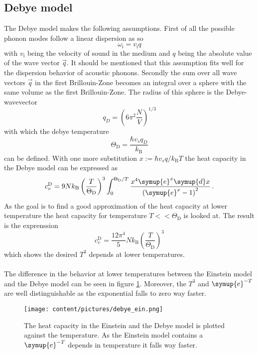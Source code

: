\subsection{Debye model}
The Debye model makes the following assumptions.
First of all the possible phonon modes follow a linear dispersion as so 
\begin{equation*}
    \omega_\text{i} = v_\text{i} q
\end{equation*}
with $v_\text{i}$ being the velocity of sound in the medium and $q$ being the absolute value of the wave vector $\vec{q}$.
It should be mentioned that this assumption fits well for the dispersion behavior of acoustic phonons.
Secondly the sum over all wave vectors $\vec{q}$ in the first Brillouin-Zone becomes an integral over a sphere with the same volume as the first Brillouin-Zone.
The radius of this sphere is the Debye-wavevector 
\begin{equation*}
    q_D = \left ( 6 \pi^2 \frac{N}{V} \right )^{1/3}
\end{equation*}
with which the debye temperature
\begin{equation*}
    \Theta_\text{D} = \frac{\hbar v_s q_{D}}{k_\text{B}}
\end{equation*}
can be defined.
With one more substitution $x :=  \hbar v_s q / k_\text{B}T$ the heat capacity in the Debye model can be expressed as
\begin{equation*}
    c_v ^{\text{D}} = 9 N k_\text{B} \left (\frac{T}{\Theta_\text{D}} \right )^3 \int_0^{\Theta_\text{D}/T} \frac{x^4 \symup{e}^x \symup{d}x}{\left( \symup{e}^x - 1\right)^2} \, .
    \label{eq:heat_debye}
\end{equation*}
As the goal is to find a good approximation of the heat capacity at lower temperature the heat capacity for temperature $T<<\Theta_\text{D}$ is looked at.
The result is the exprenssion
\begin{equation*}
    c_v ^{\text{D}} = \frac{12 \pi^4}{5} N k_\text{B} \left ( \frac{T}{\Theta_\text{D}} \right )^3
\end{equation*}
which shows the desired $T^3$ depends at lower temperatures.\\\\
The difference in the behavior at lower temperatures between the Einstein model and the Debye model can be seen in figure \ref{fig:ein_deb}.
Moreover, the $T^3$ and $\symup{e}^{-T}$ are well distinguishable as the exponential falls to zero way faster.
\begin{figure}
    \centering
    \texttt{[image: content/pictures/debye\_ein.png]}
    \caption{The heat capacity in the Einstein and the Debye model is plotted against the temperature. As the Einstein model contains a $\symup{e}^{-T}$ depends in temperature it falls way faster.}
    \label{fig:ein_deb}
\end{figure}